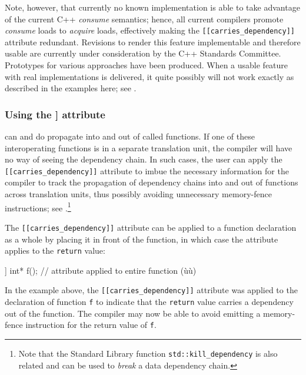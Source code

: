 Note, however, that currently no known implementation is able to take
advantage of the current C++ \emph{consume} semantics; hence, all
current compilers promote \emph{consume} loads to \emph{acquire} loads,
effectively making the \lstinline![[carries_dependency]]! attribute
redundant. Revisions to render this feature implementable and therefore
usable are currently under consideration by the C++ Standards Committee.
Prototypes for various approaches have been produced. When a usable
feature with real implementations is delivered, it quite possibly will
not work exactly as described in the examples here; see . 

\subsubsection[Using the {\protect\lstinline![[carries_dependency]]!} attribute]{Using the {\SubsubsecCode [[carries\_dependency]]} attribute}\label{using-the-[[carries_dependency]]-attribute}

 can and do propagate into and out of
called functions. If one of these interoperating functions is in a
separate translation unit, the compiler will have no way of seeing the
dependency chain. In such cases, the user can apply the
\lstinline![[carries_dependency]]! attribute to imbue the necessary
information for the compiler to track the propagation of dependency
chains into and out of functions across translation units, thus possibly
avoiding unnecessary memory-fence instructions; see .{\cprotect\footnote{Note that the Standard Library function
\lstinline!std::kill_dependency! is also related and can be used to
  \emph{break} a data dependency chain.}} 

The \lstinline![[carries_dependency]]! attribute can be applied to a
function declaration as a whole by placing it in front of the function,
in which case the attribute applies to the \lstinline!return! value:

\begin{emcppslisting}
[[carries_dependency]] int* f();  // attribute applied to entire function (ù{}ù)
\end{emcppslisting}
    
\noindent In the example above, the \lstinline![[carries_dependency]]! attribute was
applied to the declaration of function \lstinline!f! to indicate that the
\lstinline!return! value carries a dependency out of the function. The
compiler may now be able to avoid emitting a memory-fence instruction
for the return value of \lstinline!f!.

